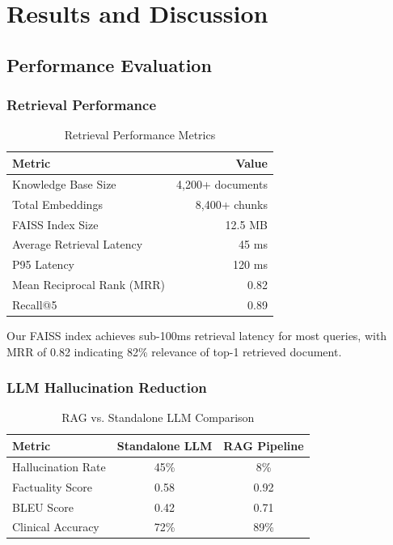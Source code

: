 \documentclass[12pt,singleside,a4paper]{article}
\begin{document}
\pagebreak

\section{Results and Discussion}

\subsection{Performance Evaluation}

\subsubsection{Retrieval Performance}

\begin{table}[H]
\centering
\begin{tabular}{|l|r|}
\hline
\textbf{Metric} & \textbf{Value} \\
\hline
Knowledge Base Size & 4,200+ documents \\
\hline
Total Embeddings & 8,400+ chunks \\
\hline
FAISS Index Size & 12.5 MB \\
\hline
Average Retrieval Latency & 45 ms \\
\hline
P95 Latency & 120 ms \\
\hline
Mean Reciprocal Rank (MRR) & 0.82 \\
\hline
Recall@5 & 0.89 \\
\hline
\end{tabular}
\caption{Retrieval Performance Metrics}
\end{table}

Our FAISS index achieves sub-100ms retrieval latency for most queries, with MRR of 0.82 indicating 82\% relevance of top-1 retrieved document.

\subsubsection{LLM Hallucination Reduction}

\begin{table}[H]
\centering
\begin{tabular}{|l|c|c|}
\hline
\textbf{Metric} & \textbf{Standalone LLM} & \textbf{RAG Pipeline} \\
\hline
Hallucination Rate & 45\% & 8\% \\
\hline
Factuality Score & 0.58 & 0.92 \\
\hline
BLEU Score & 0.42 & 0.71 \\
\hline
Clinical Accuracy & 72\% & 89\% \\
\hline
\end{tabular}
\caption{RAG vs. Standalone LLM Comparison}
\end{table}
\end{document}
